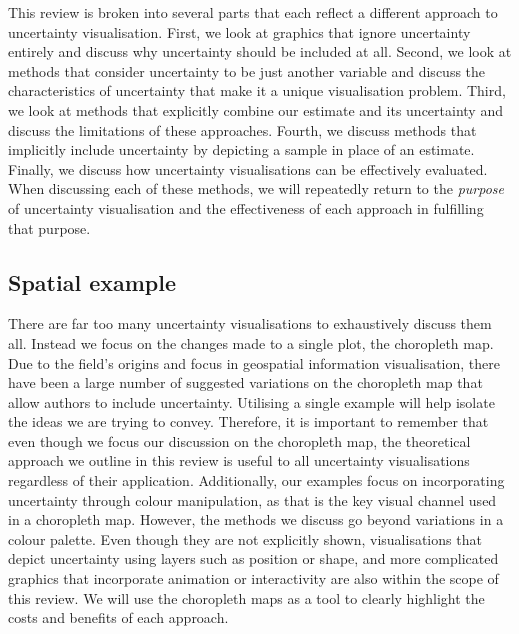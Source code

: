 \documentclass[
  12pt]{article}
\begin{document}
This review is broken into several parts that each reflect a different
approach to uncertainty visualisation. First, we look at graphics that
ignore uncertainty entirely and discuss why uncertainty should be
included at all. Second, we look at methods that consider uncertainty to
be just another variable and discuss the characteristics of uncertainty
that make it a unique visualisation problem. Third, we look at methods
that explicitly combine our estimate and its uncertainty and discuss the
limitations of these approaches. Fourth, we discuss methods that
implicitly include uncertainty by depicting a sample in place of an
estimate. Finally, we discuss how uncertainty visualisations can be
effectively evaluated. When discussing each of these methods, we will
repeatedly return to the \emph{purpose} of uncertainty visualisation and
the effectiveness of each approach in fulfilling that purpose.

\subsection{Spatial example}\label{spatial-example}

There are far too many uncertainty visualisations to exhaustively
discuss them all. Instead we focus on the changes made to a single plot,
the choropleth map. Due to the field's origins and focus in geospatial
information visualisation, there have been a large number of suggested
variations on the choropleth map that allow authors to include
uncertainty. Utilising a single example will help isolate the ideas we
are trying to convey. Therefore, it is important to remember that even
though we focus our discussion on the choropleth map, the theoretical
approach we outline in this review is useful to all uncertainty
visualisations regardless of their application. Additionally, our
examples focus on incorporating uncertainty through colour manipulation,
as that is the key visual channel used in a choropleth map. However, the
methods we discuss go beyond variations in a colour palette. Even though
they are not explicitly shown, visualisations that depict uncertainty
using layers such as position or shape, and more complicated graphics
that incorporate animation or interactivity are also within the scope of
this review. We will use the choropleth maps as a tool to clearly
highlight the costs and benefits of each approach.
\end{document}
